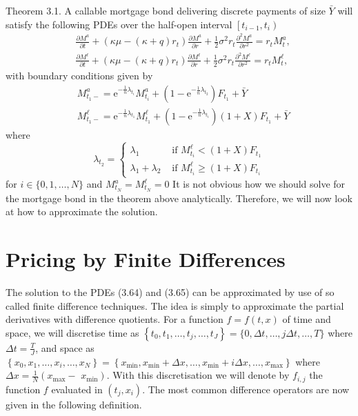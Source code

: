 \documentclass[12pt,twoside]{reedthesis}
\begin{document}
Theorem 3.1. A callable mortgage bond delivering discrete payments of size \(\bar{Y}\) will satisfy the following PDEs over the half-open interval \(\left[t_{i-1}, t_{i}\right)\)
\[
\begin{aligned}
&\frac{\partial M^{a}}{\partial t}+\left(\kappa \mu-(\kappa+q) r_{t}\right) \frac{\partial M^{a}}{\partial r}+\frac{1}{2} \sigma^{2} r_{t} \frac{\partial^{2} M^{a}}{\partial r^{2}}=r_{t} M_{t}^{a}, \\
&\frac{\partial M^{\ell}}{\partial t}+\left(\kappa \mu-(\kappa+q) r_{t}\right) \frac{\partial M^{\ell}}{\partial r}+\frac{1}{2} \sigma^{2} r_{t} \frac{\partial^{2} M^{\ell}}{\partial r^{2}}=r_{t} M_{t}^{\ell},
\end{aligned}
\]
with boundary conditions given by
\[
\begin{aligned}
&M_{t_{1}-}^{a}=\mathrm{e}^{-\frac{1}{n} \lambda_{t_{i}}} M_{t_{i}}^{a}+\left(1-\mathrm{e}^{-\frac{1}{n} \lambda_{t_{2}}}\right) F_{t_{1}}+\bar{Y} \\
&M_{t_{1}-}^{\ell}=\mathrm{e}^{-\frac{1}{n} \lambda_{t_{1}}} M_{t_{1}}^{\ell}+\left(1-\mathrm{e}^{-\frac{1}{n} \lambda_{t_{i}}}\right)(1+X) F_{t_{1}}+\bar{Y}
\end{aligned}
\]
where
\[
\lambda_{t_{2}}= \begin{cases}\lambda_{1} & \text { if } M_{t_{i}}^{\ell}<(1+X) F_{t_{1}} \\ \lambda_{1}+\lambda_{2} & \text { if } M_{t_{i}}^{\ell} \geq(1+X) F_{t_{i}}\end{cases}
\]
for \(i \in\{0,1, \ldots, N\}\) and \(M_{t_{N}}^{a}=M_{t_{N}}^{\ell}=0\)
It is not obvious how we should solve for the mortgage bond in the theorem above analytically. Therefore, we will now look at how to approximate the solution.

\hypertarget{pricing-by-finite-differences}{%
\section{Pricing by Finite Differences}\label{pricing-by-finite-differences}}

The solution to the PDEs (3.64) and (3.65) can be approximated by use of so called finite difference techniques. The idea is simply to approximate the partial derivatives with difference quotients. For a function \(f=f(t, x)\) of time and space, we will discretise time as \(\left\{t_{0}, t_{1}, \ldots, t_{j}, \ldots, t_{J}\right\}=\{0, \Delta t, \ldots, j \Delta t, \ldots, T\}\) where \(\Delta t=\frac{T}{J}\), and space as \(\left\{x_{0}, x_{1}, \ldots, x_{i}, \ldots, x_{N}\right\}=\left\{x_{\min }, x_{\min }+\Delta x, \ldots, x_{\min }+i \Delta x, \ldots, x_{\max }\right\}\) where \(\Delta x=\frac{1}{N}\left(x_{\max }-\right.\) \(\left.x_{\min }\right)\). With this discretisation we will denote by \(f_{i, j}\) the function \(f\) evaluated in \(\left(t_{j}, x_{i}\right)\). The most common difference operators are now given in the following definition.
\end{document}

